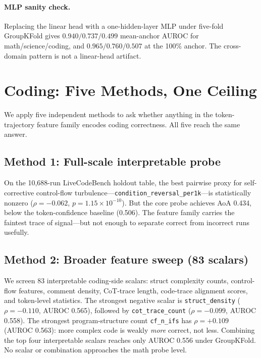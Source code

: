\documentclass{article}
\begin{document}
\paragraph{MLP sanity check.} Replacing the linear head with a one-hidden-layer MLP under five-fold GroupKFold gives $0.940/0.737/0.499$ mean-anchor AUROC for math/science/coding, and $0.965/0.760/0.507$ at the 100\% anchor. The cross-domain pattern is not a linear-head artifact.

\section{Coding: Five Methods, One Ceiling}
\label{sec:coding}

We apply five independent methods to ask whether anything in the token-trajectory feature family encodes coding correctness. All five reach the same answer.

\subsection{Method 1: Full-scale interpretable probe}

On the 10,688-run LiveCodeBench holdout table, the best pairwise proxy for self-corrective control-flow turbulence---\texttt{condition\_reversal\_per1k}---is statistically nonzero ($\rho = -0.062$, $p = 1.15\times 10^{-10}$). But the core probe achieves AoA 0.434, below the token-confidence baseline (0.506). The feature family carries the faintest trace of signal---but not enough to separate correct from incorrect runs usefully.

\subsection{Method 2: Broader feature sweep (83 scalars)}

We screen 83 interpretable coding-side scalars: struct complexity counts, control-flow features, comment density, CoT-trace length, code-trace alignment scores, and token-level statistics. The strongest negative scalar is \texttt{struct\_density} ($\rho = -0.110$, AUROC 0.565), followed by \texttt{cot\_trace\_count} ($\rho = -0.099$, AUROC 0.558). The strongest program-structure count \texttt{cf\_n\_ifs} has $\rho = +0.109$ (AUROC 0.563): more complex code is weakly \emph{more} correct, not less. Combining the top four interpretable scalars reaches only AUROC 0.556 under GroupKFold. No scalar or combination approaches the math probe level.
\end{document}
